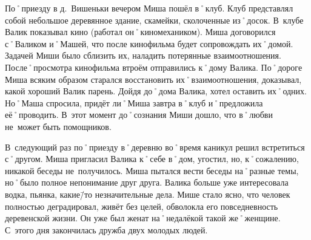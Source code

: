 По˚приезду в д.~Вишеньки вечером Миша пошёл в˚клуб. Клуб представлял собой небольшое деревянное здание, скамейки, сколоченные из˚досок. В~клубе Валик показывал кино (работал он˚киномехаником). Миша договорился с˚Валиком и˚Машей, что после кинофильма будет сопровождать их˚домой. Задачей Миши было сблизить их, наладить потерянные взаимоотношения. После˚просмотра кинофильма втроём отправились к˚дому Валика. По˚дороге Миша всяким образом старался восстановить их˚взаимоотношения, доказывал, какой хороший Валик парень. Дойдя до˚дома Валика, хотел оставить их˚одних. Но˚Маша спросила, придёт ли˚Миша завтра в˚клуб и˚предложила её˚проводить. В~этот момент до˚сознания Миши дошло, что в˚любви не~может быть помощников.

В~следующий раз по˚приезду в˚деревню во˚время каникул решил встретиться с˚другом. Миша пригласил Валика к˚себе в˚дом, угостил, но, к˚сожалению, никакой беседы не~получилось. Миша пытался вести беседы на˚разные темы, но˚было полное непонимание друг друга. Валика больше уже интересовала водка, пьянка, какие\=/то незначительные дела. Мише стало ясно, что человек полностью деградировал, живёт без целей, обволокла его повседневность деревенской жизни. Он уже был женат на˚недалёкой такой же˚женщине. С~этого дня закончилась дружба двух молодых людей.
